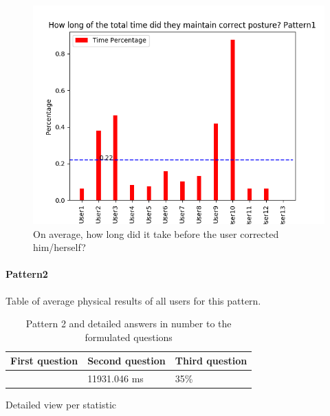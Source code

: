 \documentclass[sigconf]{acmart}
\begin{document}
\begin{figure}[h]
\centering
\includegraphics[width=\columnwidth, scale=1]{p1_q3.png}
\caption{On average, how long did it take before the user corrected him/herself?}
\end{figure}
\pagebreak




\paragraph {Pattern2}
Table of average physical results of all users for this pattern.\\
\begin{table}[htb]
\caption{Pattern 2 and detailed answers in number to the formulated questions}
\label{my-label}
\begin{tabular}{|l|l|l|}
\hline
\multicolumn{1}{|c|}{\textbf{First question}} & \multicolumn{1}{c|}{\textbf{Second question}} & \multicolumn{1}{c|}{\textbf{Third question}} \\ \hline
 [24.0, 26.0, 22.0]& 11931.046 ms & 35\%  \\ \hline
\end{tabular}
\end{table}

Detailed view per statistic
\end{document}
